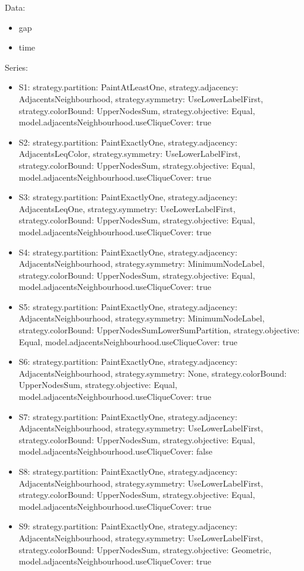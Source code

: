 \documentclass[landscape, 12pt]{report}
\begin{document}
	\clearpage
	Data:
	\begin{itemize}
	\item gap
	\item time
	\end{itemize}
	Series:
	\begin{itemize}
	\item S1: strategy.partition: PaintAtLeastOne, strategy.adjacency: AdjacentsNeighbourhood, strategy.symmetry: UseLowerLabelFirst, strategy.colorBound: UpperNodesSum, strategy.objective: Equal, model.adjacentsNeighbourhood.useCliqueCover: true
	\item S2: strategy.partition: PaintExactlyOne, strategy.adjacency: AdjacentsLeqColor, strategy.symmetry: UseLowerLabelFirst, strategy.colorBound: UpperNodesSum, strategy.objective: Equal, model.adjacentsNeighbourhood.useCliqueCover: true
	\item S3: strategy.partition: PaintExactlyOne, strategy.adjacency: AdjacentsLeqOne, strategy.symmetry: UseLowerLabelFirst, strategy.colorBound: UpperNodesSum, strategy.objective: Equal, model.adjacentsNeighbourhood.useCliqueCover: true
	\item S4: strategy.partition: PaintExactlyOne, strategy.adjacency: AdjacentsNeighbourhood, strategy.symmetry: MinimumNodeLabel, strategy.colorBound: UpperNodesSum, strategy.objective: Equal, model.adjacentsNeighbourhood.useCliqueCover: true
	\item S5: strategy.partition: PaintExactlyOne, strategy.adjacency: AdjacentsNeighbourhood, strategy.symmetry: MinimumNodeLabel, strategy.colorBound: UpperNodesSumLowerSumPartition, strategy.objective: Equal, model.adjacentsNeighbourhood.useCliqueCover: true
	\item S6: strategy.partition: PaintExactlyOne, strategy.adjacency: AdjacentsNeighbourhood, strategy.symmetry: None, strategy.colorBound: UpperNodesSum, strategy.objective: Equal, model.adjacentsNeighbourhood.useCliqueCover: true
	\item S7: strategy.partition: PaintExactlyOne, strategy.adjacency: AdjacentsNeighbourhood, strategy.symmetry: UseLowerLabelFirst, strategy.colorBound: UpperNodesSum, strategy.objective: Equal, model.adjacentsNeighbourhood.useCliqueCover: false
	\item S8: strategy.partition: PaintExactlyOne, strategy.adjacency: AdjacentsNeighbourhood, strategy.symmetry: UseLowerLabelFirst, strategy.colorBound: UpperNodesSum, strategy.objective: Equal, model.adjacentsNeighbourhood.useCliqueCover: true
	\item S9: strategy.partition: PaintExactlyOne, strategy.adjacency: AdjacentsNeighbourhood, strategy.symmetry: UseLowerLabelFirst, strategy.colorBound: UpperNodesSum, strategy.objective: Geometric, model.adjacentsNeighbourhood.useCliqueCover: true

\end{itemize}
\end{document}
